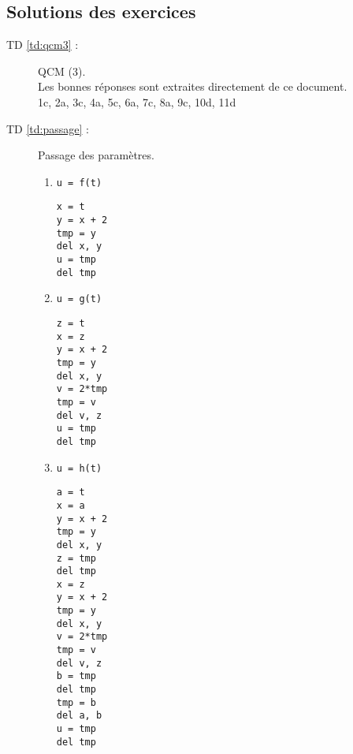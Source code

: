 \subsection{Solutions des exercices}\label{sub:solutions}
\begin{description}
\item[TD \ref{td:qcm3} :] QCM (3).\\
	Les bonnes réponses sont extraites directement de ce document.\\
	1c, 2a, 3c, 4a, 5c, 6a, 7c, 8a, 9c, 10d, 11d

\item[TD \ref{td:passage} :] Passage des paramètres.\\
\begin{minipage}[t]{6cm}
\begin{enumerate}

\item {\tt u = f(t)}

\begin{py}{6cm}
\begin{verbatim}
x = t
y = x + 2
tmp = y
del x, y
u = tmp
del tmp
\end{verbatim}
\end{py}
\end{enumerate}
\end{minipage}
\hfill
\begin{minipage}[t]{6cm}
\begin{enumerate}\setcounter{enumi}{1}

\item {\tt u = g(t)}

\begin{py}{6cm}
\begin{verbatim}
z = t
x = z
y = x + 2
tmp = y
del x, y
v = 2*tmp
tmp = v
del v, z
u = tmp
del tmp
\end{verbatim}
\end{py}
\end{enumerate}
\end{minipage}
\hfill
\begin{minipage}[t]{6cm}
\begin{enumerate}\setcounter{enumi}{2}

\item {\tt u = h(t)}

\begin{py}{6cm}
\begin{verbatim}
a = t
x = a
y = x + 2
tmp = y
del x, y
z = tmp
del tmp
x = z
y = x + 2
tmp = y
del x, y
v = 2*tmp
tmp = v
del v, z
b = tmp
del tmp
tmp = b
del a, b
u = tmp
del tmp
\end{verbatim}
\end{py}


\end{enumerate}
\end{minipage}
\end{description}
